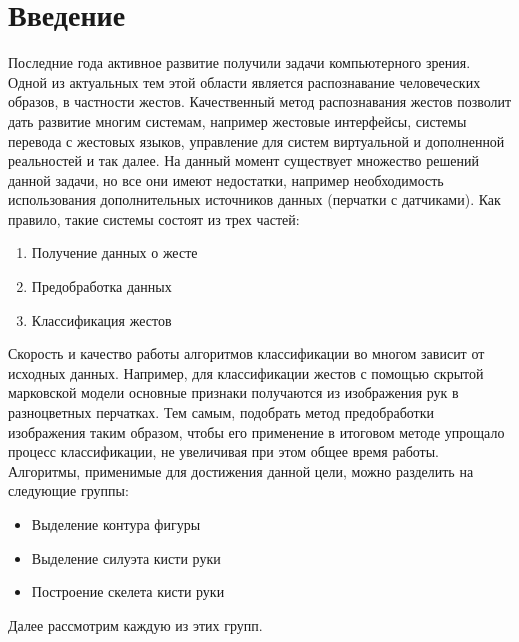 \section{Введение}
\label{sec:Intro}

Последние года активное развитие получили задачи компьютерного зрения. Одной из актуальных тем этой области является распознавание человеческих образов, в частности жестов. Качественный метод распознавания жестов позволит дать развитие многим системам, например жестовые интерфейсы, системы перевода с жестовых языков, управление для систем виртуальной и дополненной реальностей и так далее. На данный момент существует множество решений данной задачи\cite{slr}, но все они имеют недостатки, например необходимость использования дополнительных источников данных (перчатки с датчиками). 
Как правило, такие системы состоят из трех частей:

\begin{enumerate}
	\item Получение данных о жесте
	\item Предобработка данных
	\item Классификация жестов
\end{enumerate}

Скорость и качество работы алгоритмов классификации во многом зависит от исходных данных. Например, для классификации жестов с помощью скрытой марковской модели \cite{inproceedings} основные признаки получаются из изображения рук в разноцветных перчатках. Тем самым, подобрать метод предобработки изображения таким образом, чтобы его применение в итоговом методе упрощало процесс классификации, не увеличивая при этом общее время работы. Алгоритмы, применимые для достижения данной цели, можно разделить на следующие группы:
\begin{itemize}
	\item Выделение контура фигуры
	\item Выделение силуэта кисти руки
	\item Построение скелета кисти руки
\end{itemize}

Далее рассмотрим каждую из этих групп.